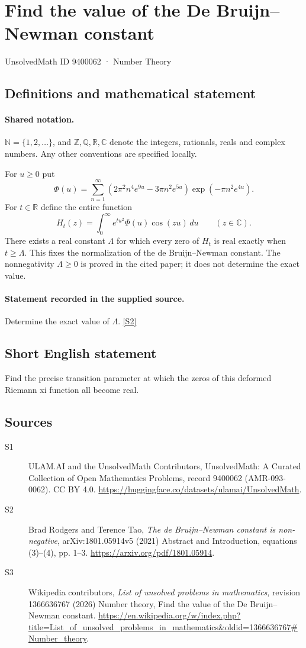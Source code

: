 \documentclass[11pt]{article}
\newcommand{\sref}[2]{\hyperlink{source:#1:#2}{[S#2]}}
\begin{document}
\setcounter{section}{9400061}
\section{Find the value of the De Bruijn–Newman constant}\label{9400062}
{\small\sffamily UnsolvedMath ID 9400062 · Number Theory}
\subsection{Definitions and mathematical statement}

\paragraph{Shared notation.}$\mathbb N=\{1,2,\ldots\}$, and $\mathbb Z,\mathbb Q,\mathbb R,\mathbb C$ denote the integers, rationals, reals and complex numbers. Any other conventions are specified locally.


For $u\ge0$ put
\[
\Phi(u)=\sum_{n=1}^{\infty}(2\pi^2n^4e^{9u}-3\pi n^2e^{5u})\exp(-\pi n^2e^{4u}).
\]
For $t\in\mathbb R$ define the entire function
\[
H_t(z)=\int_0^{\infty}e^{tu^2}\Phi(u)\cos(zu)\,du\qquad(z\in\mathbb C).
\]
There exists a real constant $\Lambda$ for which every zero of $H_t$ is real exactly when $t\ge\Lambda$. This fixes the normalization of the de Bruijn--Newman constant. The nonnegativity $\Lambda\ge0$ is proved in the cited paper; it does not determine the exact value.
\paragraph{Statement recorded in the supplied source.}
Determine the exact value of $\Lambda$. \sref{9400062}{2}
\subsection{Short English statement}
Find the precise transition parameter at which the zeros of this deformed Riemann xi function all become real.
\subsection{Sources}
\begin{description}
\item[\hypertarget{source:9400062:1}{S1}] ULAM.AI and the UnsolvedMath Contributors, UnsolvedMath: A Curated Collection of Open Mathematics Problems, record 9400062 (AMR-093-0062). CC BY 4.0. \url{https://huggingface.co/datasets/ulamai/UnsolvedMath}.
\item[\hypertarget{source:9400062:2}{S2}] Brad Rodgers and Terence Tao, \emph{The de Bruijn--Newman constant is non-negative}, arXiv:1801.05914v5 (2021) Abstract and Introduction, equations (3)--(4), pp. 1--3. \url{https://arxiv.org/pdf/1801.05914}.
\item[\hypertarget{source:9400062:3}{S3}] Wikipedia contributors, \emph{List of unsolved problems in mathematics}, revision 1366636767 (2026) Number theory, Find the value of the De Bruijn–Newman constant. \url{https://en.wikipedia.org/w/index.php?title=List_of_unsolved_problems_in_mathematics&oldid=1366636767#Number_theory}.
\end{description}
\label{end:9400062}
\end{document}
